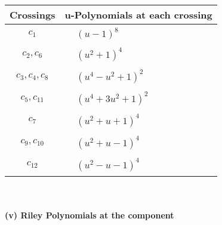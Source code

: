 \documentclass[1p]{elsarticle_modified}
\theoremstyle{definition}
\begin{document}
\begin{tabular}{m{50pt}|m{274pt}}
Crossings & \hspace{64pt}u-Polynomials at each crossing \\
\hline $$\begin{aligned}c_{1}\end{aligned}$$&$\begin{aligned}
&(u-1)^8
\end{aligned}$\\
\hline $$\begin{aligned}c_{2},c_{6}\end{aligned}$$&$\begin{aligned}
&(u^2+1)^4
\end{aligned}$\\
\hline $$\begin{aligned}c_{3},c_{4},c_{8}\end{aligned}$$&$\begin{aligned}
&(u^4- u^2+1)^2
\end{aligned}$\\
\hline $$\begin{aligned}c_{5},c_{11}\end{aligned}$$&$\begin{aligned}
&(u^4+3 u^2+1)^2
\end{aligned}$\\
\hline $$\begin{aligned}c_{7}\end{aligned}$$&$\begin{aligned}
&(u^2+u+1)^4
\end{aligned}$\\
\hline $$\begin{aligned}c_{9},c_{10}\end{aligned}$$&$\begin{aligned}
&(u^2+u-1)^4
\end{aligned}$\\
\hline $$\begin{aligned}c_{12}\end{aligned}$$&$\begin{aligned}
&(u^2- u-1)^4
\end{aligned}$\\
\hline
\end{tabular}\\~\\
\newpage\renewcommand{\arraystretch}{1}
\flushleft \textbf{(v) Riley Polynomials at the component}\newline \\
\end{document}
